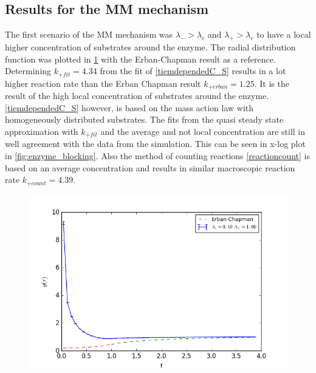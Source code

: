\documentclass[
  a4paper,BCOR10mm,oneside,
  headsepline,footsepline,%
  fleqn,openbib
]{scrbook}
\begin{document}
\subsection{Results for the MM mechanism}
The first scenario of the MM mechanism was $\lambda_{-}>\lambda_c$ and $\lambda_{+}>\lambda_c$ to have a local higher concentration of substrates around the enzyme. The radial distribution function was plotted in \cref{fig:diffusion1_limit-radial_local concentration} with the Erban-Chapman result as a reference. Determining $k_{+fit}=4.34$ from the fit of \cref{tiemdependedC_S} results in a lot higher reaction rate than the Erban Chapman result $k_{+erban}=1.25$. It is the result of the high local concentration of substrates around the enzyme. \cref{tiemdependedC_S} however, is based on the mass action law with homogeneously distributed substrates. The fits from the quasi steady state approximation  with $k_{+fit}$ and the average and not local concentration are still in well agreement with the data from the simulation. This can be seen in x-log plot in \cref{fig:enzyme_blocking}. Also the method of counting reactions \cref{reactioncount} is based on an average concentration and results in similar macroscopic reaction rate $k_{+count}=4.39$. 
\begin{figure}
  \centering
  \includegraphics[width=\textwidth]{./data/limit-radial-highlocalconcentration.png}
  \captionsetup{width=\linewidth}
  \label{fig:diffusion1_limit-radial_local concentration}
\end{figure}
\end{document}
